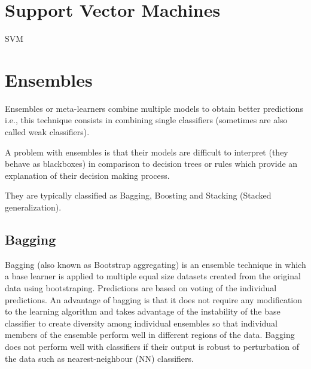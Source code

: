 \documentclass[
]{book}
\newenvironment{Shaded}{\begin{snugshade}}{\end{snugshade}}
\newcommand{\CommentTok}[1]{\textcolor[rgb]{0.56,0.35,0.01}{\textit{#1}}}
\begin{document}
\begin{Shaded}
\end{Shaded}

\hypertarget{support-vector-machines}{%
\section{Support Vector Machines}\label{support-vector-machines}}

SVM

\hypertarget{ensembles}{%
\section{Ensembles}\label{ensembles}}

Ensembles or meta-learners combine multiple models to obtain better predictions i.e., this technique consists in combining single classifiers (sometimes are also called weak classifiers).

A problem with ensembles is that their models are difficult to interpret (they behave as blackboxes) in comparison to
decision trees or rules which provide an explanation of their
decision making process.

They are typically classified as Bagging, Boosting and Stacking (Stacked generalization).

\hypertarget{bagging}{%
\subsection{Bagging}\label{bagging}}

Bagging (also known as Bootstrap aggregating) is an ensemble technique in which a base learner is applied to multiple equal size datasets created from the original data using bootstraping. Predictions are based on voting of the individual predictions. An advantage of bagging is that it does not require any modification to the learning algorithm and takes advantage of the instability of the base classifier to create diversity among individual ensembles so that individual members of the ensemble perform well in different regions of the data. Bagging does not perform well with classifiers if their output is robust to perturbation of the data such as
nearest-neighbour (NN) classifiers.
\end{document}
